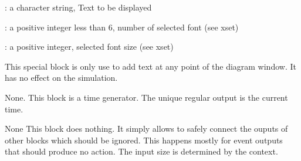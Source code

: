 %
%


\label{TEXTf}

\begin{scitem}
\item[{\verb?txt?}]
: a character string, Text to be displayed
\item[{\verb?font?}]
: a positive integer less than 6, number of selected font (see xset)
\item[{\verb?siz?}]
: a positive integer, selected font size (see xset)
\end{scitem}%
This special block is only use to add text at any point of the diagram
window. It has no effect on the simulation.
%
%


\label{TIMEf}

None.
This block is a time generator. The unique regular output is the
current time.





%
%


\label{TRASHf}

None
This block does nothing. It simply allows to safely connect the ouputs
of other blocks which should be ignored. This happens mostly for event
outputs that should produce no action. The input size is determined
by the context.








%
%


\label{WFILEf}

